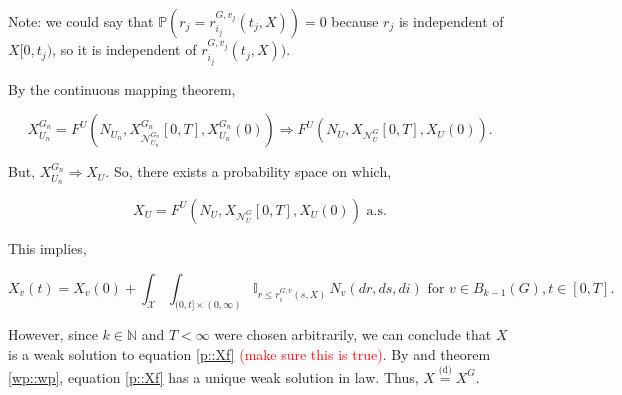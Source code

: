 \documentclass[12pt]{article}
\newcommand{\mb}{\mathbb}
\newcommand{\mc}{\mathcal}
\newcommand{\te}{\text}
\newcommand{\tr}{\textcolor{red}}
\newcommand{\ind}{\hspace{24pt}}
\newcommand{\pr}{\mb{P}}							%
\newcommand{\deq}{\overset{\text{(d)}}{=}}			%
\newcommand{\sta}{\mc{X}}							%
\newcommand{\gneigh}[2]{\mc{N}^{#1}_{#2}}			%
\newcommand{\Xf}{X}									%
\newcommand{\poiss}{N}								%
\newcommand{\rate}{r}								%
\newcommand{\poissv}[1]{_{#1}}						%
\newcommand{\vind}[1]{_{#1}}						%
\newcommand{\tme}[1]{(#1)}							%
\newcommand{\tmi}[1]{#1}							%
\newcommand{\gind}[1]{^{#1}}						%
\newcommand{\vpara}[1]{^{#1}}						%
\newcommand{\stpara}[1]{_{#1}}						%
\newcommand{\gvpara}[2]{^{#1,#2}}					%
\newcommand{\tmepro}[2]{(#1,#2)}					%
\newcommand{\trnc}[1]{B_{#1}}						%
\renewcommand{\it}[1]{_{#1}}						%
\begin{document}
Note: we could say that \(\pr(r\it{j} = \rate\gvpara{G}{v\it{j}}\stpara{i\it{j}}\tmepro{t\it{j}}{\Xf}) = 0\) because \(r\it{j}\) is independent of \(\Xf\tmi{[0,t\it{j})}\), so it is independent of \(\rate\gvpara{G}{v\it{j}}\stpara{i\it{j}}\tmepro{t\it{j}}{\Xf})\).

\ind By the continuous mapping theorem, 

\[\Xf\gind{G\it{n}}\vind{U\it{n}} = F\vpara{U}\left(\poiss\poissv{U\it{n}},\Xf\gind{G\it{n}}\vind{\gneigh{G\it{n}}{U\it{n}}}\tmi{[0,T]},\Xf\gind{G\it{n}}\vind{U\it{n}}\tme{0}\right) \Rightarrow F\vpara{U}\left(\poiss\poissv{U},\Xf\vind{\gneigh{G}{U}}\tmi{[0,T]},\Xf\vind{U}\tme{0}\right).\]

But, \(\Xf\gind{G\it{n}}\vind{U\it{n}} \Rightarrow \Xf\vind{U}\). So, there exists a probability space on which,

\[\Xf\vind{U} = F\vpara{U}\left(\poiss\poissv{U},\Xf\vind{\gneigh{G}{U}}\tmi{[0,T]},\Xf\vind{U}\tme{0}\right)\te{ a.s.}\]

This implies,

\[\Xf\vind{v}\tme{t} = \Xf\vind{v}\tme{0} + \int_\sta\int_{(0,t]\times (0,\infty)} \mb{I}_{r \leq \rate\gvpara{G}{v}\stpara{i}\tmepro{s}{\Xf}}\,\poiss\poissv{v}(dr,ds,di) \te{ for } v \in \trnc{k-1}(G), t \in [0,T].\]

However, since \(k\in \mb{N}\) and \(T < \infty\) were chosen arbitrarily, we can conclude that \(\Xf\) is a weak solution to equation \eqref{p::Xf} \tr{(make sure this is true)}. By \cite[Proposition 2.10]{Kur07} and theorem \ref{wp::wp}, equation \eqref{p::Xf} has a unique weak solution in law. Thus, \(\Xf \deq \Xf\gind{G}\).








\newpage
\end{document}
